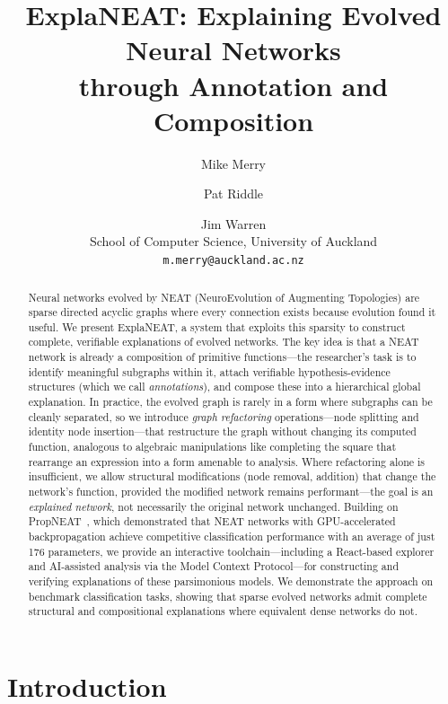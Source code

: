 \documentclass[11pt]{article}
\title{ExplaNEAT: Explaining Evolved Neural Networks\\through Annotation and Composition}
\author{
Mike Merry \and Pat Riddle \and Jim Warren \\
School of Computer Science, University of Auckland \\
\texttt{m.merry@auckland.ac.nz}
}
\begin{document}
\maketitle

\begin{abstract}
Neural networks evolved by NEAT (NeuroEvolution of Augmenting Topologies) are sparse directed acyclic graphs where every connection exists because evolution found it useful. We present ExplaNEAT, a system that exploits this sparsity to construct complete, verifiable explanations of evolved networks. The key idea is that a NEAT network is already a composition of primitive functions---the researcher's task is to identify meaningful subgraphs within it, attach verifiable hypothesis-evidence structures (which we call \emph{annotations}), and compose these into a hierarchical global explanation. In practice, the evolved graph is rarely in a form where subgraphs can be cleanly separated, so we introduce \emph{graph refactoring} operations---node splitting and identity node insertion---that restructure the graph without changing its computed function, analogous to algebraic manipulations like completing the square that rearrange an expression into a form amenable to analysis. Where refactoring alone is insufficient, we allow structural modifications (node removal, addition) that change the network's function, provided the modified network remains performant---the goal is an \emph{explained network}, not necessarily the original network unchanged. Building on PropNEAT~\cite{merry2025propneat}, which demonstrated that NEAT networks with GPU-accelerated backpropagation achieve competitive classification performance with an average of just 176 parameters, we provide an interactive toolchain---including a React-based explorer and AI-assisted analysis via the Model Context Protocol---for constructing and verifying explanations of these parsimonious models. We demonstrate the approach on benchmark classification tasks, showing that sparse evolved networks admit complete structural and compositional explanations where equivalent dense networks do not.

\end{abstract}

\section{Introduction}
\label{sec:introduction}
\end{document}

